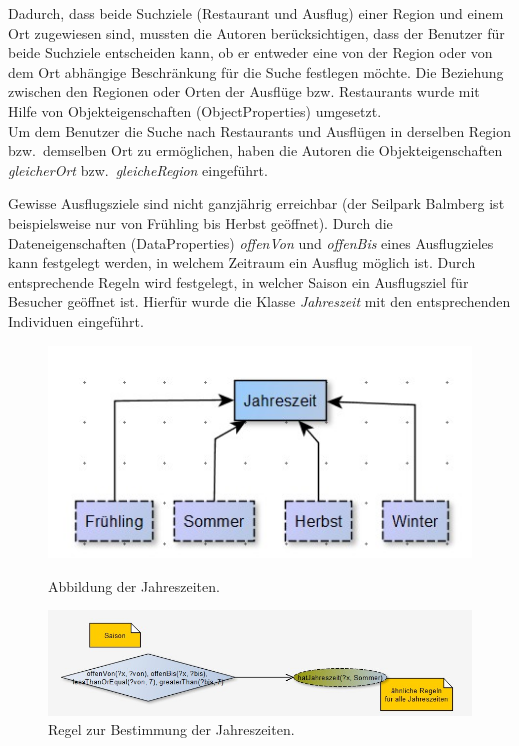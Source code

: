 Dadurch, dass beide Suchziele (Restaurant und Ausflug) einer Region und einem Ort zugewiesen sind, mussten die Autoren berücksichtigen, dass der Benutzer für beide Suchziele entscheiden kann, ob er entweder eine von der Region oder von dem Ort abhängige Beschränkung für die Suche festlegen möchte. Die Beziehung zwischen den Regionen oder Orten der Ausflüge bzw. Restaurants wurde mit Hilfe von Objekteigenschaften (ObjectProperties) umgesetzt.\\
Um dem Benutzer die Suche nach Restaurants und Ausflügen in derselben Region bzw.\ demselben Ort zu ermöglichen, haben die Autoren die Objekteigenschaften \textit{gleicherOrt} bzw.\ \textit{gleicheRegion} eingeführt.

Gewisse Ausflugsziele sind nicht ganzjährig erreichbar (der Seilpark Balmberg ist beispielsweise nur von Frühling bis Herbst geöffnet). Durch die Dateneigenschaften (DataProperties) \textit{offenVon} und \textit{offenBis} eines Ausflugzieles kann festgelegt werden, in welchem Zeitraum ein Ausflug möglich ist. Durch entsprechende Regeln wird festgelegt, in welcher Saison ein Ausflugsziel für Besucher geöffnet ist. Hierfür wurde die Klasse \textit{Jahreszeit} mit den entsprechenden Individuen eingeführt.\\
    \begin{figure}[H]%
        \begin{minipage}[hbt]{0,49\textwidth}
            \centering
            \includegraphics[scale=0.3]{bilder/SaisonKlasse.jpg}
            \caption{Abbildung der Jahreszeiten.\label{fig:SaisonKlasse}\protect\footnotemark}
        \end{minipage}
        \begin{minipage}[hbt]{0,49\textwidth}
            \centering
            \includegraphics[scale=0.3]{bilder/SaisonRegeln.jpg}
            \caption{Regel zur Bestimmung der Jahreszeiten.\label{fig:SaisonRegeln}\protect\footnotemark[5]}
        \end{minipage}
    \end{figure}


